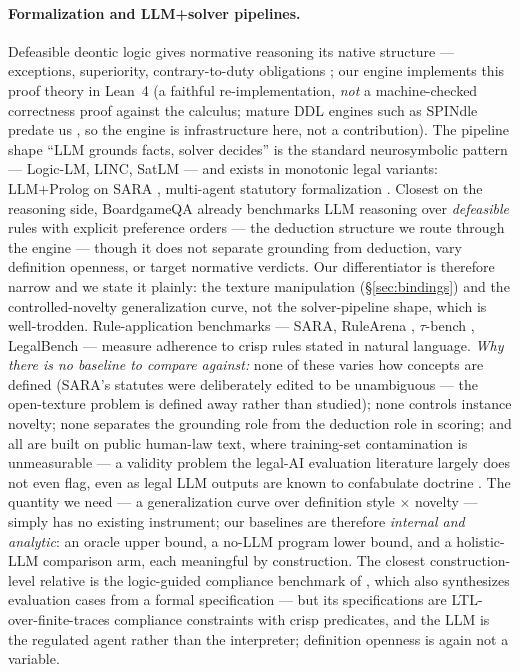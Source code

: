 \paragraph{Formalization and LLM+solver pipelines.}
Defeasible deontic logic gives normative reasoning its native structure ---
exceptions, superiority, contrary-to-duty obligations
\citep{governatori2006violations,governatori2018practical,governatori2024oddity};
our engine implements this proof theory in Lean~4 (a faithful
re-implementation, \emph{not} a machine-checked correctness proof against the
calculus; mature DDL engines such as SPINdle predate us
\citep{lam2009spindle}, so the engine is infrastructure here, not a
contribution). The pipeline shape ``LLM grounds facts, solver decides'' is the
standard neurosymbolic pattern --- Logic-LM, LINC, SatLM
\citep{pan2023logiclm,olausson2023linc,ye2023satlm} --- and exists in
monotonic legal variants: LLM+Prolog on SARA
\citep{zhang2025prolog,holzenberger2020sara}, multi-agent statutory
formalization \citep{multiagent2025statutory}. Closest on the reasoning side,
BoardgameQA \citep{kazemi2023boardgameqa} already benchmarks LLM reasoning
over \emph{defeasible} rules with explicit preference orders --- the deduction
structure we route through the engine --- though it does not separate
grounding from deduction, vary definition openness, or target normative
verdicts. Our differentiator is therefore narrow and we state it plainly: the
texture manipulation (\S\ref{sec:bindings}) and the controlled-novelty
generalization curve, not the solver-pipeline shape, which is well-trodden.
Rule-application benchmarks --- SARA, RuleArena \citep{rulearena2024},
$\tau$-bench \citep{yao2024taubench}, LegalBench \citep{guha2023legalbench}
--- measure adherence to crisp rules stated in natural language.
\emph{Why there is no baseline to compare against:} none of these varies how
concepts are defined (SARA's statutes were deliberately edited to be
unambiguous --- the open-texture problem is defined away rather than studied);
none controls instance novelty; none separates the grounding role from the
deduction role in scoring; and all are built on public human-law text, where
training-set contamination is unmeasurable
\citep{magar2022contamination,sainz2023contamination} --- a validity problem
the legal-AI evaluation literature largely does not even flag, even as legal
LLM outputs are known to confabulate doctrine \citep{dahl2024hallucination}.
The quantity we need --- a generalization curve over definition style $\times$
novelty --- simply has no existing instrument; our baselines are therefore
\emph{internal and analytic}: an oracle upper bound, a no-LLM program lower
bound, and a holistic-LLM comparison arm, each meaningful by construction.
The closest construction-level relative is the logic-guided compliance
benchmark of \citet{logicguided2026}, which also synthesizes evaluation
cases from a formal specification --- but its specifications are
LTL-over-finite-traces compliance constraints with crisp predicates, and the
LLM is the regulated agent rather than the interpreter; definition openness
is again not a variable.

